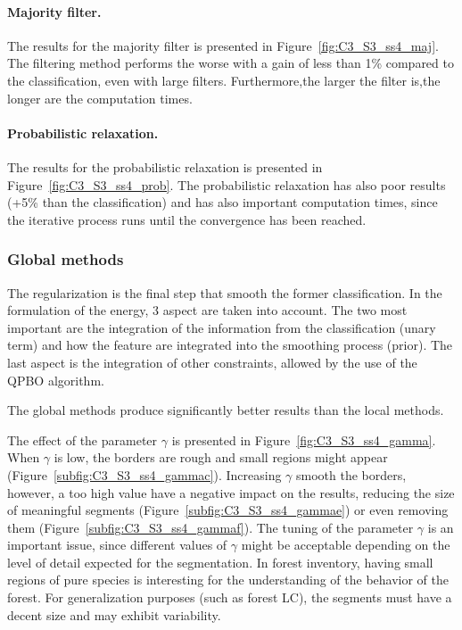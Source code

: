 \paragraph{Majority filter. \\}
The results for the majority filter is presented in Figure~\ref{fig:C3_S3_ss4_maj}.  The filtering method performs the worse with a gain of less than 1\% compared to the classification, even with large filters. Furthermore,the larger the filter is,the longer are the computation times. 

\paragraph{Probabilistic relaxation. \\}
The results for the probabilistic relaxation is presented in Figure~\ref{fig:C3_S3_ss4_prob}. The probabilistic relaxation has also poor results (+5\% than the classification) and has also important computation times, since the iterative process runs until the convergence has been reached.

\subsubsection{Global methods}
The regularization is the final step that smooth the former classification. In the formulation of the energy, 3 aspect are taken into account. The two most important are the integration of the information from the classification (unary term) and how the feature are integrated into the smoothing process (prior). The last aspect is the integration of other constraints, allowed by the use of the QPBO algorithm.

The global methods produce significantly better results than the local methods.

The effect of the parameter $\gamma$ is presented in Figure~\ref{fig:C3_S3_ss4_gamma}. When $\gamma$ is low, the borders are rough and small regions might appear (Figure~\ref{subfig:C3_S3_ss4_gammac}). Increasing $\gamma$ smooth the borders, however, a too high value have a negative impact on the results, reducing the size of meaningful segments (Figure~\ref{subfig:C3_S3_ss4_gammae}) or even removing them (Figure~\ref{subfig:C3_S3_ss4_gammaf}). The tuning of the parameter $\gamma$ is an important issue, since different values of $\gamma$ might be acceptable depending on the level of detail expected for the segmentation. In forest inventory, having small regions of pure species is interesting for the understanding of the behavior of the forest. For generalization purposes (such as forest LC), the segments must have a decent size and may exhibit variability.

